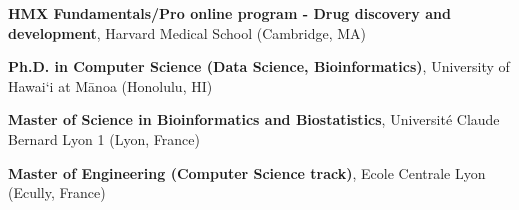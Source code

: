 %
%
%


\begin{scholarship}
					{\textbf{HMX Fundamentals/Pro online program - Drug discovery and development}, Harvard Medical School (Cambridge, MA)}

					{\textbf{Ph.D. in Computer Science (Data Science, Bioinformatics)}, University of Hawai‘i at Mānoa (Honolulu, HI)}
				
					{\textbf{Master of Science in Bioinformatics and Biostatistics}, Université Claude Bernard Lyon 1 (Lyon, France)}
					
					{\textbf{Master of Engineering (Computer Science track)}, Ecole Centrale Lyon (Ecully, France)}
\end{scholarship}